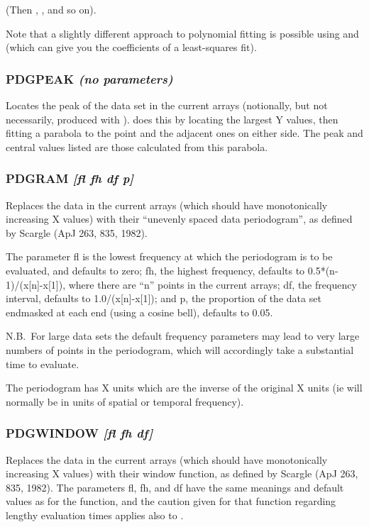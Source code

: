 \documentclass[twoside,11pt,noabs,nolof]{starlink}
\providecommand{\dipcom}[3]{\subsubsection*{\label{COM:#1}\xlabel{COM:#1}\textbf{#1} \emph{#2}}}
\begin{document}
(Then ,  ,  and so on).

Note that a slightly different approach to polynomial fitting is
possible using   and   (which can give you the coefficients
of a least-squares fit).

\dipcom{PDGPEAK}{(no parameters)}{Locates the peak of a data set}
Locates the peak of the data set in the current arrays (notionally, but
not necessarily, produced with ).    does this by locating
the largest Y values, then fitting a parabola to the point and the
adjacent ones on either side. The peak and central values listed are
those calculated from this parabola.

\dipcom{PDGRAM}{[fl fh df p]}{Takes the "unevenly spaced data periodogram" of the current arrays}
Replaces the data in the current arrays (which should have
monotonically increasing X values) with their ``unevenly spaced data
periodogram'', as defined by Scargle (ApJ 263, 835, 1982).

The parameter fl is the lowest frequency at which the periodogram is
to be evaluated, and defaults to zero; fh, the highest frequency,
defaults to 0.5*(n-1)/(x[n]-x[1]), where there are ``n'' points in the
current arrays; df, the frequency interval, defaults to
1.0/(x[n]-x[1]); and p, the proportion of the data set endmasked at
each end (using a cosine bell), defaults to 0.05.

N.B.\ For large data sets the default frequency parameters may lead to
very large numbers of points in the periodogram, which will
accordingly take a substantial time to evaluate.

The periodogram has X units which are the inverse of the original X
units (ie will normally be in units of spatial or temporal frequency).

\dipcom{PDGWINDOW}{[fl fh df]}{Takes the "window function" of the current arrays}
Replaces the data in the current arrays (which should have
monotonically increasing X values) with their window function, as
defined by Scargle (ApJ 263, 835, 1982). The parameters fl, fh, and df
have the same meanings and default values as for the   function,
and the caution given for that function regarding lengthy evaluation
times applies also to .
\end{document}

